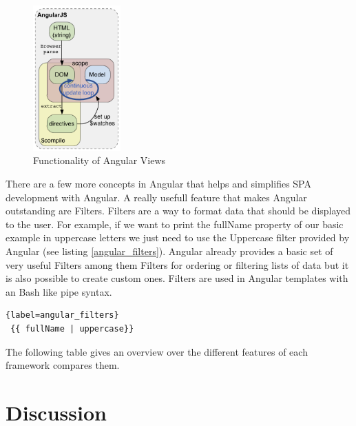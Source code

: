 \begin{figure}
	\centering	
	\includegraphics[width=0.3\textwidth]{./img/angular_view_2.png}
	\caption{Functionality of Angular Views}
	\label{fig:angular_views_2}
\end{figure} 

There are a few more concepts in Angular that helps and simplifies SPA development with Angular. A really usefull feature that makes Angular outstanding are Filters.
Filters are a way to format data that should be displayed to the user. For example, if we want to print the fullName property of our basic example in uppercase letters we just need to use the Uppercase filter provided by Angular (see listing \ref{angular_filters}). Angular already provides a basic set of very useful Filters among them Filters for ordering or filtering lists of data but it is also possible to create custom ones. Filters are used in Angular templates with an Bash like pipe syntax.

\begin{lstlisting}{label=angular_filters}
 {{ fullName | uppercase}}
\end{lstlisting}





The following table gives an overview over the different features of each framework compares them.




\section{Discussion}

